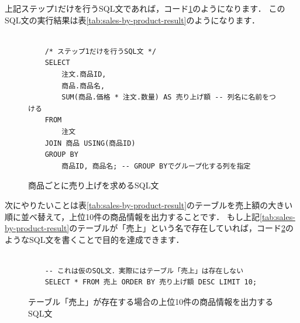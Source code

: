 上記ステップ1だけを行うSQL文であれば，コード\ref{code:sql-sales-by-product}のようになります．
このSQL文の実行結果は表\ref{tab:sales-by-product-result}のようになります．
\begin{figure}[!htbp]
    \begin{verbatim}

    /* ステップ1だけを行うSQL文 */
    SELECT
        注文.商品ID,
        商品.商品名,
        SUM(商品.価格 * 注文.数量) AS 売り上げ額 -- 列名に名前をつける
    FROM
        注文
    JOIN 商品 USING(商品ID)
    GROUP BY
        商品ID, 商品名; -- GROUP BYでグループ化する列を指定

    \end{verbatim}
    \captionsetup{name=コード}
    \caption{商品ごとに売り上げを求めるSQL文}
    \label{code:sql-sales-by-product}
\end{figure}
\begin{table}[!htbp]
    \centering
    \caption{商品ごとに売り上げを求めるSQL文の実行結果}
    \label{tab:sales-by-product-result}
\end{table}


次にやりたいことは表\ref{tab:sales-by-product-result}のテーブルを売上額の大きい順に並べ替えて，上位10件の商品情報を出力することです．
もし上記\ref{tab:sales-by-product-result}のテーブルが「売上」という名で存在していれば，コード\ref{code:sales-top10-sql}のようなSQL文を書くことで目的を達成できます．
\begin{figure}[!htbp]
    \begin{verbatim}

    -- これは仮のSQL文．実際にはテーブル「売上」は存在しない
    SELECT * FROM 売上 ORDER BY 売り上げ額 DESC LIMIT 10;

    \end{verbatim}
    \captionsetup{name=コード}
    \caption{テーブル「売上」が存在する場合の上位10件の商品情報を出力するSQL文}
    \label{code:sales-top10-sql}
\end{figure}

